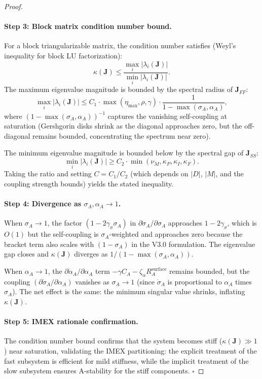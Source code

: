 \begin{proof}
\paragraph{Step 3: Block matrix condition number bound.}
For a block triangularizable matrix, the condition number satisfies
(Weyl's inequality for block LU factorization):
\[
\kappa(\mathbf{J}) \leq \frac{\max_i |\lambda_i(\mathbf{J})|}{\min_i |\lambda_i(\mathbf{J})|}.
\]
The maximum eigenvalue magnitude is bounded by the spectral radius
of $\mathbf{J}_{FF}$:
\[
\max_i |\lambda_i(\mathbf{J})| \leq C_1 \cdot \max(\eta_{\max}, \rho, \gamma) \cdot \frac{1}{1 - \max(\sigma_A, \alpha_A)},
\]
where $(1 - \max(\sigma_A, \alpha_A))^{-1}$ captures the vanishing
self-coupling at saturation (Gershgorin disks shrink as the diagonal
approaches zero, but the off-diagonal remains bounded, concentrating
the spectrum near zero).

The minimum eigenvalue magnitude is bounded below by the spectral
gap of $\mathbf{J}_{SS}$:
\[
\min_i |\lambda_i(\mathbf{J})| \geq C_2 \cdot \min(\nu_M, \kappa_P, \kappa_I, \kappa_F).
\]
Taking the ratio and setting $C = C_1 / C_2$ (which depends on $|D|$,
$|M|$, and the coupling strength bounds) yields the stated inequality.

\paragraph{Step 4: Divergence as $\sigma_A, \alpha_A \to 1$.}
When $\sigma_A \to 1$, the factor $(1 - 2\gamma_\sigma \sigma_A)$ in
$\partial \dot{\sigma}_A / \partial \sigma_A$ approaches $1 - 2\gamma_\sigma$,
which is $O(1)$ but the self-coupling is $\sigma_A$-weighted and
approaches zero because the bracket term also scales with $(1 - \sigma_A)$
in the V3.0 formulation. The eigenvalue gap closes and $\kappa(\mathbf{J})$
diverges as $1/(1 - \max(\sigma_A, \alpha_A))$.

When $\alpha_A \to 1$, the $\partial \dot{\alpha}_A / \partial \alpha_A$
term $-\gamma C_A - \zeta_\alpha R_A^{\text{surface}}$ remains bounded,
but the coupling $(\partial \dot{\sigma}_A / \partial \alpha_A)$
vanishes as $\sigma_A \to 1$ (since $\dot{\sigma}_A$ is proportional to
$\alpha_A$ times $\sigma_A$). The net effect is the same: the minimum
singular value shrinks, inflating $\kappa(\mathbf{J})$.

\paragraph{Step 5: IMEX rationale confirmation.}
The condition number bound confirms that the system becomes stiff
($\kappa(\mathbf{J}) \gg 1$) near saturation, validating the IMEX
partitioning: the explicit treatment of the fast subsystem is
efficient for mild stiffness, while the implicit treatment of the
slow subsystem ensures A-stability for the stiff components.
$\square$
\end{proof}

